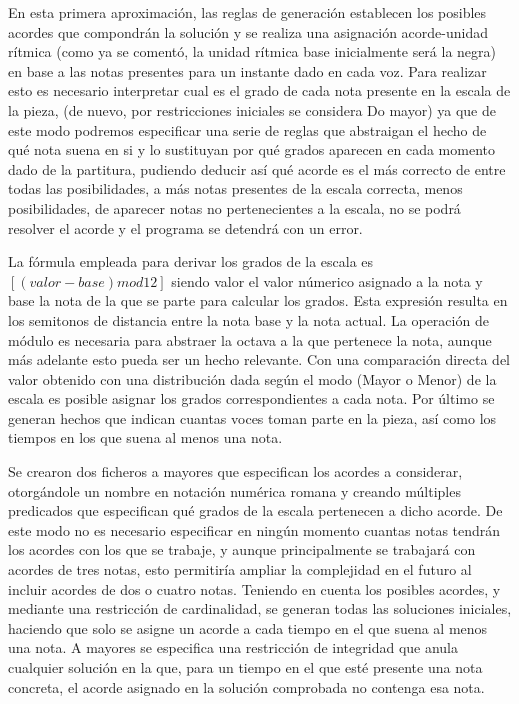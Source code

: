 En esta primera aproximación, las reglas de generación establecen los posibles acordes que compondrán la solución y se realiza una asignación acorde-unidad rítmica (como ya se comentó, la unidad rítmica base inicialmente será la negra) en base a las notas presentes para un instante dado en cada voz. Para realizar esto es necesario interpretar cual es el grado de cada nota presente en la escala de la pieza, (de nuevo, por restricciones iniciales se considera Do mayor) ya que de este modo podremos especificar una serie de reglas que abstraigan el hecho de qué nota suena en si y lo sustituyan por qué grados aparecen en cada momento dado de la partitura, pudiendo deducir así qué acorde es el más correcto de entre todas las posibilidades, a más notas presentes de la escala correcta, menos posibilidades, de aparecer notas no pertenecientes a la escala, no se podrá resolver el acorde y el programa se detendrá con un error.

La fórmula empleada para derivar los grados de la escala es $[(valor-base) mod 12]$ siendo valor el valor númerico asignado a la nota y base la nota de la que se parte para calcular los grados. Esta expresión resulta en los semitonos de distancia entre la nota base y la nota actual. La operación de módulo es necesaria para abstraer la octava a la que pertenece la nota, aunque más adelante esto pueda ser un hecho relevante. Con una comparación directa del valor obtenido con una distribución dada según el modo (Mayor o Menor) de la escala es posible asignar los grados correspondientes a cada nota. Por último se generan hechos que indican cuantas voces toman parte en la pieza, así como los tiempos en los que suena al menos una nota.

Se crearon dos ficheros a mayores que especifican los acordes a considerar, otorgándole un nombre en notación numérica romana y creando múltiples predicados que especifican qué grados de la escala pertenecen a dicho acorde. De este modo no es necesario especificar en ningún momento cuantas notas tendrán los acordes con los que se trabaje, y aunque principalmente se trabajará con acordes de tres notas, esto permitiría ampliar la complejidad en el futuro al incluir acordes de dos o cuatro notas. Teniendo en cuenta los posibles acordes, y mediante una restricción de cardinalidad, se generan todas las soluciones iniciales, haciendo que solo se asigne un acorde a cada tiempo en el que suena al menos una nota. A mayores se especifica una restricción de integridad que anula cualquier solución en la que, para un tiempo en el que esté presente una nota concreta, el acorde asignado en la solución comprobada no contenga esa nota. 

